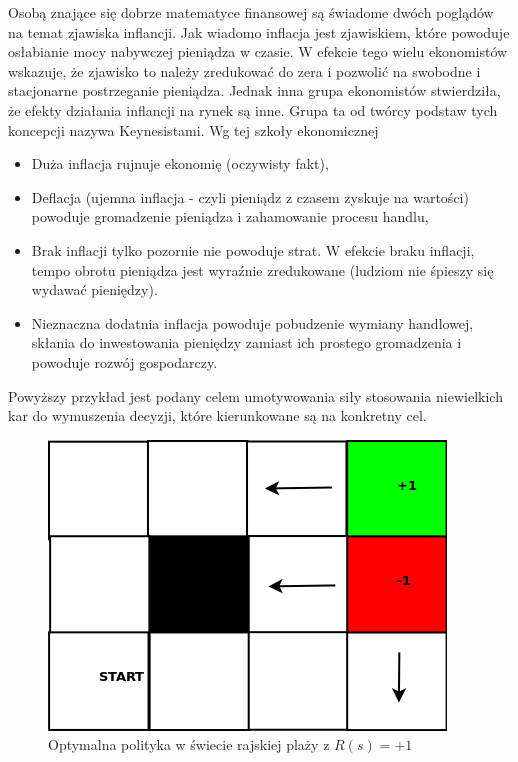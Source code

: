 \documentclass[10pt,a4paper]{book}
\begin{document}
\begin{example}
Osobą znające się dobrze matematyce finansowej są świadome dwóch poglądów na temat zjawiska inflancji. Jak wiadomo inflacja jest zjawiskiem, które powoduje osłabianie mocy nabywczej pieniądza w czasie. W efekcie tego wielu ekonomistów wskazuje, że zjawisko to należy zredukować do zera i pozwolić na swobodne i stacjonarne postrzeganie pieniądza. Jednak inna grupa ekonomistów stwierdziła, że efekty działania inflancji na rynek są inne. Grupa ta od twórcy podstaw tych koncepcji nazywa Keynesistami. Wg tej szkoły ekonomicznej
\begin{itemize}
\item Duża inflacja rujnuje ekonomię (oczywisty fakt),
\item Deflacja (ujemna inflacja - czyli pieniądz z czasem zyskuje na wartości) powoduje gromadzenie pieniądza i zahamowanie procesu handlu,
\item Brak inflacji tylko pozornie nie powoduje strat. W efekcie braku inflacji, tempo obrotu pieniądza jest wyraźnie zredukowane (ludziom nie śpieszy się wydawać pieniędzy).
\item Nieznaczna dodatnia inflacja powoduje pobudzenie wymiany handlowej, skłania do inwestowania pieniędzy zamiast ich prostego gromadzenia i powoduje rozwój gospodarczy.
\end{itemize}
\end{example}

Powyższy przykład jest podany celem umotywowania siły stosowania niewielkich kar do wymuszenia decyzji, które kierunkowane są na konkretny cel.

\begin{figure}
\centering
\includegraphics[scale=0.3]{grids/warm_world.png}
\caption{Optymalna polityka w świecie rajskiej plaży z $R(s) = +1$} \label{fig-paradise-sand}
\end{figure}
\end{document}
